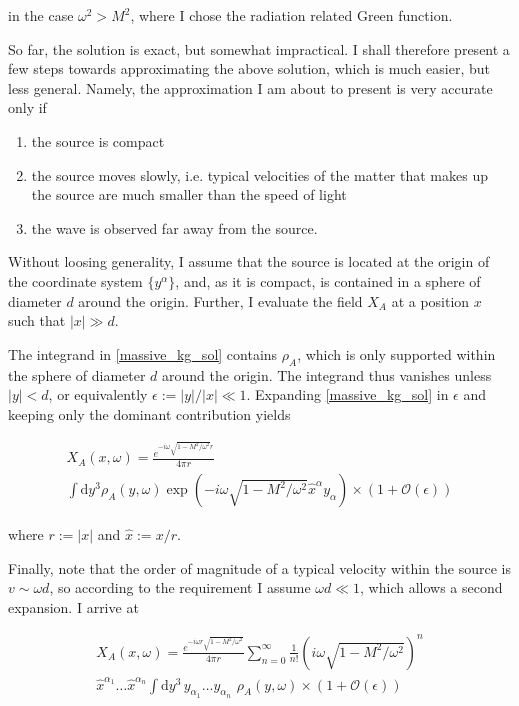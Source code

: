 \documentclass[11pt]{article}
\begin{document}
in the case $\omega ^2 > M^2 $, where I chose the radiation related Green function.

So far, the solution is exact, but somewhat impractical. I shall therefore present a few steps towards approximating the  above solution, which is much easier, but less general. Namely, the approximation I am about to present is very accurate only if 

\begin{enumerate}
	\item the source is compact
	\item the source moves slowly, i.e. typical velocities of the matter that makes up the source are much smaller than the speed of light
	\item the wave is observed far away from the source.
	
\end{enumerate}

Without loosing generality, I assume that the source is located at the origin of the coordinate system $\{ y^\alpha \}$, and, as it is compact, is contained in a sphere of diameter $d$ around the origin. Further, I evaluate the field $X_A$ at a position $x$ such that $\left| x \right| \gg d$. 

The integrand in \ref{massive_kg_sol} contains $\rho_A$, which is only supported within the sphere of diameter $d$ around the origin. The integrand thus vanishes unless $\left| y \right| < d $,  or equivalently $ \epsilon := \left| y \right| / \left| x \right| \ll 1$. Expanding \ref{massive_kg_sol} in $\epsilon$ and keeping only the dominant contribution yields

\begin{multline}
	X_A \left( x, \omega \right) 
	=
	\frac{e^{-i \omega \sqrt{1 - M^2 / \omega^2} r}}{4 \pi r}
	\\
	\int \mathrm{d} y^3  \rho_A \left( y, \omega \right)
		\exp 
		\left( 
			-i \omega \sqrt{1 - M^2 / \omega^2} \hat x^\alpha  y_\alpha 
		\right)
		\times
		\left( 
			1 + \mathcal{O} \left( \epsilon \right)
		\right)
\end{multline}

where $r := \left| x \right| $ and $\hat x := x / r$.

Finally, note that the order of magnitude of a typical velocity within the source is $v \sim \omega d$, so according to the requirement I assume $\omega d \ll 1$, which allows a second expansion. I arrive at

\begin{multline} \label{gen_sol}
	X_A \left( x, \omega \right)
	 = \frac{e^{- i \omega r\sqrt{1 - M^2 / \omega^2}}}{4 \pi r }
	\sum_{n = 0}^\infty
	\frac{1}{n!} 
	\left( 
		i \omega \sqrt{1 - M^2 / \omega^2}
	\right)^n
	\\
	\hat x^{\alpha_1} \dots \hat x^{\alpha_n}
	\int \mathrm{d }y^3 \, y_{\alpha_1}  \dots y_{\alpha_n}\,\,
	\rho_A \left( y, \omega \right)
	\times
		\left( 
			1 + \mathcal{O} \left( \epsilon \right)
		\right)
\end{multline}
\end{document}
